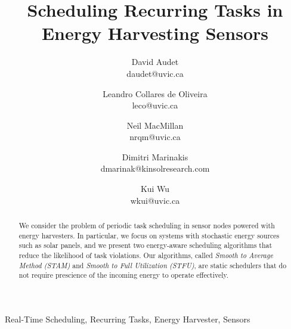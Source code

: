 \documentclass[10pt,conference]{IEEEtran}
\begin{document}
\title{Scheduling Recurring Tasks in Energy Harvesting Sensors}
\author{David Audet\\daudet@uvic.ca \and Leandro {Collares de Oliveira}\\leco@uvic.ca \and Neil MacMillan\\nrqm@uvic.ca \and Dimitri Marinakis\\dmarinak@kinsolresearch.com \and Kui Wu\\wkui@uvic.ca}

\maketitle


\begin{abstract}

We consider the problem of periodic task scheduling in sensor nodes powered with energy harvesters. In particular, we focus on systems with stochastic energy sources such as solar panels, and we present two energy-aware scheduling algorithms that reduce the likelihood of task violations. Our algorithms, called \emph{Smooth to Average Method (\textsc{STAM})} and \emph{Smooth to Full Utilization (\textsc{STFU})}, are static schedulers that do not require prescience of the incoming energy to operate effectively.
\end{abstract}

\begin{IEEEkeywords} Real-Time Scheduling, Recurring Tasks, Energy Harvester, Sensors
\end{IEEEkeywords}















\balance




\end{document}
